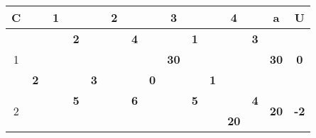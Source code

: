 \documentclass[a4paper, 12pt]{article}
\begin{document}
\begin{table}[H]
  \centering
    \begin{tabular}{|c|cccc|cccc|cccc|cccc|rr|}
    \hline
    C     & \multicolumn{4}{c|}{1}        & \multicolumn{4}{c|}{2}        & \multicolumn{4}{c|}{3}        & \multicolumn{4}{c|}{4}        & \multicolumn{1}{c|}{a} & \multicolumn{1}{c|}{U} \bigstrut\\
    \hline
    \multirow{4}[6]{*}{1} &       &       & \multicolumn{1}{r|}{} & \textbf{2} &       &       & \multicolumn{1}{r|}{} & \textbf{4} &       &       & \multicolumn{1}{r|}{} & \cellcolor[rgb]{ 1,  .753,  0}\textbf{1} &       &       & \multicolumn{1}{r|}{} & \textbf{3} & \multicolumn{1}{c|}{\multirow{4}[6]{*}{\textbf{30}}} & \multicolumn{1}{c|}{\multirow{4}[6]{*}{\textbf{0}}} \bigstrut\\
\cline{5-5}\cline{9-9}\cline{13-13}\cline{17-17}          &       & \multicolumn{2}{c}{\multirow{2}[2]{*}{}} &       &       & \multicolumn{2}{c}{\multirow{2}[2]{*}{}} &       &       & \multicolumn{2}{c}{\multirow{2}[2]{*}{\textbf{30}}} &       &       & \multicolumn{2}{c}{\multirow{2}[2]{*}{}} &       & \multicolumn{1}{c|}{} &  \bigstrut[t]\\
          &       & \multicolumn{2}{c}{} &       &       & \multicolumn{2}{c}{} &       &       & \multicolumn{2}{c}{} &       &       & \multicolumn{2}{c}{} &       & \multicolumn{1}{c|}{} &  \bigstrut[b]\\
\cline{2-2}\cline{6-6}\cline{10-10}\cline{14-14}          & \multicolumn{1}{c|}{\textbf{2}} & \multicolumn{2}{c}{} &       & \multicolumn{1}{c|}{\textbf{3}} & \multicolumn{2}{c}{} &       & \multicolumn{1}{c|}{\textbf{0}} & \multicolumn{2}{c}{} &       & \multicolumn{1}{c|}{\textbf{1}} & \multicolumn{2}{c}{} &       & \multicolumn{1}{c|}{} &  \bigstrut\\
    \hline
    \multirow{4}[6]{*}{2} &       &       & \multicolumn{1}{r|}{} & \textbf{5} &       &       & \multicolumn{1}{r|}{} & \textbf{6} &       &       & \multicolumn{1}{r|}{} & \textbf{5} &       &       & \multicolumn{1}{r|}{} & \cellcolor[rgb]{ 1,  .753,  0}\textbf{4} & \multicolumn{1}{c|}{\multirow{4}[6]{*}{\textbf{20}}} & \multicolumn{1}{c|}{\multirow{4}[6]{*}{\textbf{-2}}} \bigstrut\\
\cline{5-5}\cline{9-9}\cline{13-13}\cline{17-17}          &       & \multicolumn{2}{c}{\multirow{2}[2]{*}{}} &       &       & \multicolumn{2}{c}{\multirow{2}[2]{*}{}} &       &       & \multicolumn{2}{c}{\multirow{2}[2]{*}{}} & \multirow{3}[4]{*}{} &       & \multicolumn{2}{c}{\multirow{2}[2]{*}{\textbf{20}}} &       & \multicolumn{1}{c|}{} &  \bigstrut[t]\\

\end{tabular}
\end{table}
\end{document}
